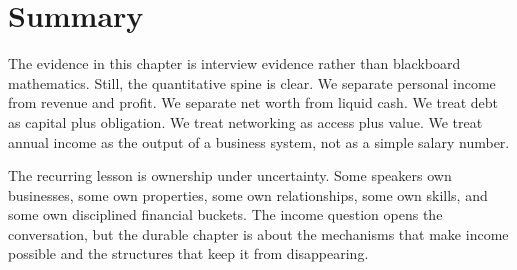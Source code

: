 \section{Summary}

The evidence in this chapter is interview evidence rather than blackboard mathematics. Still, the quantitative spine is clear. We separate personal income from revenue and profit. We separate net worth from liquid cash. We treat debt as capital plus obligation. We treat networking as access plus value. We treat annual income as the output of a business system, not as a simple salary number.

The recurring lesson is ownership under uncertainty. Some speakers own businesses, some own properties, some own relationships, some own skills, and some own disciplined financial buckets. The income question opens the conversation, but the durable chapter is about the mechanisms that make income possible and the structures that keep it from disappearing.
